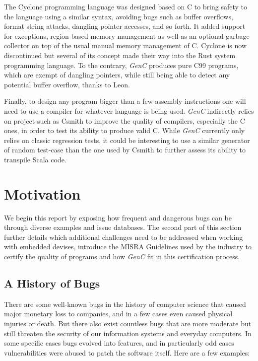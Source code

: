 \documentclass[a4paper,twoside]{article}
\let\oldsection\section
\renewcommand\section{\cleardoublepage\oldsection}
\newcommand{\GenC}{\emph{GenC}\xspace}
\begin{document}
The Cyclone programming language \cite{cyclone} was designed based on C to bring
safety to the language using a similar syntax, avoiding bugs such as buffer
overflows, format string attacks, dangling pointer accesses, and so forth. It
added support for exceptions, region-based memory management as well as an
optional garbage collector on top of the usual manual memory management of C.
Cyclone is now discontinued but several of its concept made their way into the
Rust system programming language. To the contrary, \GenC produces pure C99
programs, which are exempt of dangling pointers, while still being able to
detect any potential buffer overflow, thanks to Leon.

Finally, to design any program bigger than a few assembly instructions one will
need to use a compiler for whatever language is being used. \GenC indirectly
relies on project such as Csmith \cite{csmith} to improve the quality of
compilers, especially the C ones, in order to test its ability to produce valid
C. While \GenC currently only relies on classic regression tests, it could be
interesting to use a similar generator of random test-case than the one used by
Csmith to further assess its ability to transpile Scala code.


\section{Motivation}
\label{motivation}


We begin this report by exposing how frequent and dangerous bugs can be through
diverse examples and issue databases. The second part of this section further
details which additional challenges need to be addressed when working with
embedded devises, introduce the MISRA Guidelines used by the industry to
certify the quality of programs and how \GenC fit in this certification process.


\subsection{A History of Bugs}
\label{bug_history}

There are some well-known bugs in the history of computer science that caused
major monetary loss to companies, and in a few cases even caused physical
injuries or death. But there also exist countless bugs that are more moderate
but still threaten the security of our information systems and everyday
computers. In some specific cases bugs evolved into features, and in
particularly odd cases vulnerabilities were abused to patch the software itself.
Here are a few examples:
\end{document}
